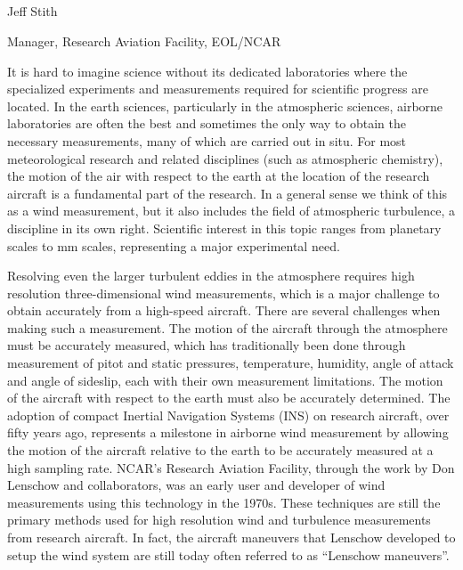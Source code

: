 \documentclass[12pt,twoside,english]{article}\usepackage[]{graphicx}\usepackage[]{color}
\begin{document}
\subsection*{}
{\centering
Jeff Stith
\par}

{\centering
Manager, Research Aviation Facility, EOL/NCAR
\par}


\bigskip

It is hard to imagine science without its dedicated laboratories where
the specialized experiments and measurements required for scientific
progress are located. In the earth sciences, particularly in the
atmospheric sciences, airborne laboratories are often the best and
sometimes the only way to obtain the necessary measurements, many of
which are carried out in situ. For most meteorological research and
related disciplines (such as atmospheric chemistry), the motion of the
air with respect to the earth at the location of the research aircraft
is a fundamental part of the research. In a general sense we think
of this as a wind measurement, but it also includes the field of
atmospheric turbulence, a discipline in its own right. Scientific
interest in this topic ranges from planetary scales to mm scales,
representing a major experimental need. 

Resolving even the larger turbulent eddies in the atmosphere requires
high resolution three-dimensional wind measurements, which is a major
challenge to obtain accurately from a high-speed aircraft. There
are several challenges when making such a measurement. The motion of
the aircraft through the atmosphere must be accurately measured, which
has traditionally been done through measurement of pitot and static
pressures, temperature, humidity, angle of attack and angle of
sideslip, each with their own measurement limitations. The motion
of the aircraft with respect to the earth must also be accurately
determined. The adoption of compact Inertial Navigation Systems
(INS) on research aircraft, over fifty years ago, represents a
milestone in airborne wind measurement by allowing the motion of the
aircraft relative to the earth to be accurately measured at a high
sampling rate. NCAR{\textquoteright}s Research Aviation Facility,
through the work by Don Lenschow and collaborators, was an early user
and developer of wind measurements using this technology in the 1970s.
These techniques are still the primary methods used for high
resolution wind and turbulence measurements from research aircraft.
In fact, the aircraft maneuvers that Lenschow developed to setup
the wind system are still today often referred to as
{\textquotedblleft}Lenschow maneuvers{\textquotedblright}. 
\end{document}

